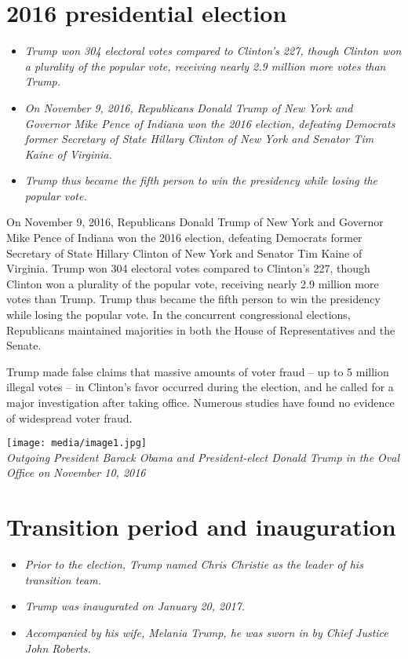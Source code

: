 \section{2016 presidential election}\label{presidential-election}

\begin{itemize}
\item
  \emph{Trump won 304 electoral votes compared to Clinton's 227, though
  Clinton won a plurality of the popular vote, receiving nearly 2.9
  million more votes than Trump.}
\item
  \emph{On November 9, 2016, Republicans Donald Trump of New York and
  Governor Mike Pence of Indiana won the 2016 election, defeating
  Democrats former Secretary of State Hillary Clinton of New York and
  Senator Tim Kaine of Virginia.}
\item
  \emph{Trump thus became the fifth person to win the presidency while
  losing the popular vote.}
\end{itemize}

On November 9, 2016, Republicans Donald Trump of New York and Governor
Mike Pence of Indiana won the 2016 election, defeating Democrats former
Secretary of State Hillary Clinton of New York and Senator Tim Kaine of
Virginia. Trump won 304 electoral votes compared to Clinton's 227,
though Clinton won a plurality of the popular vote, receiving nearly 2.9
million more votes than Trump. Trump thus became the fifth person to win
the presidency while losing the popular vote. In the concurrent
congressional elections, Republicans maintained majorities in both the
House of Representatives and the Senate.

Trump made false claims that massive amounts of voter fraud -- up to 5
million illegal votes -- in Clinton's favor occurred during the
election, and he called for a major investigation after taking office.
Numerous studies have found no evidence of widespread voter fraud.

\texttt{[image: media/image1.jpg]}\\
\emph{Outgoing President Barack Obama and President-elect Donald Trump
in the Oval Office on November 10, 2016}

\section{Transition period and
inauguration}\label{transition-period-and-inauguration}

\begin{itemize}
\item
  \emph{Prior to the election, Trump named Chris Christie as the leader
  of his transition team.}
\item
  \emph{Trump was inaugurated on January 20, 2017.}
\item
  \emph{Accompanied by his wife, Melania Trump, he was sworn in by Chief
  Justice John Roberts.}
\end{itemize}

